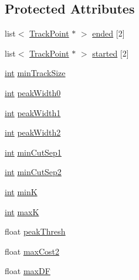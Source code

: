 \subsection*{Protected Attributes}
\begin{DoxyCompactItemize}
\item 
list$<$ \hyperlink{class__sbsms___1_1_track_point}{Track\+Point} $\ast$ $>$ \hyperlink{class__sbsms___1_1_s_m_s_aaa44a7e8ffbd745e0d22a9d2baa3f1f7}{ended} \mbox{[}2\mbox{]}
\item 
list$<$ \hyperlink{class__sbsms___1_1_track_point}{Track\+Point} $\ast$ $>$ \hyperlink{class__sbsms___1_1_s_m_s_aa19daeb405fda8a247c9e7d4a952096f}{started} \mbox{[}2\mbox{]}
\item 
\hyperlink{xmltok_8h_a5a0d4a5641ce434f1d23533f2b2e6653}{int} \hyperlink{class__sbsms___1_1_s_m_s_a7701fe63637a605329b2924aeedeccdf}{min\+Track\+Size}
\item 
\hyperlink{xmltok_8h_a5a0d4a5641ce434f1d23533f2b2e6653}{int} \hyperlink{class__sbsms___1_1_s_m_s_ad865c609c21cb25fd240f5d8019f8d92}{peak\+Width0}
\item 
\hyperlink{xmltok_8h_a5a0d4a5641ce434f1d23533f2b2e6653}{int} \hyperlink{class__sbsms___1_1_s_m_s_ac31d92bf26e86c5f2058bf04ab9aa638}{peak\+Width1}
\item 
\hyperlink{xmltok_8h_a5a0d4a5641ce434f1d23533f2b2e6653}{int} \hyperlink{class__sbsms___1_1_s_m_s_ad1b0cd6a37d7f40b12bbae565a1ef916}{peak\+Width2}
\item 
\hyperlink{xmltok_8h_a5a0d4a5641ce434f1d23533f2b2e6653}{int} \hyperlink{class__sbsms___1_1_s_m_s_aae1a8698814821e5ed36f64de1ed7518}{min\+Cut\+Sep1}
\item 
\hyperlink{xmltok_8h_a5a0d4a5641ce434f1d23533f2b2e6653}{int} \hyperlink{class__sbsms___1_1_s_m_s_afbe3a0e173399fe506361b7de4d47db5}{min\+Cut\+Sep2}
\item 
\hyperlink{xmltok_8h_a5a0d4a5641ce434f1d23533f2b2e6653}{int} \hyperlink{class__sbsms___1_1_s_m_s_afdce36212b7f4ed68bddfca463ab1467}{minK}
\item 
\hyperlink{xmltok_8h_a5a0d4a5641ce434f1d23533f2b2e6653}{int} \hyperlink{class__sbsms___1_1_s_m_s_a84ec97d301ee7890205f006627985f8b}{maxK}
\item 
float \hyperlink{class__sbsms___1_1_s_m_s_a8ec22b5d80c510467dc7f5a49e2a125d}{peak\+Thresh}
\item 
float \hyperlink{class__sbsms___1_1_s_m_s_ad1797e7e94e753371a63c4f18aa1c70d}{max\+Cost2}
\item 
float \hyperlink{class__sbsms___1_1_s_m_s_a3c93453f28f4d44e346e3fe6c7863dfe}{max\+DF}

\end{DoxyCompactItemize}

